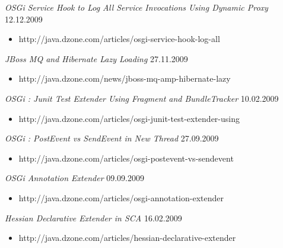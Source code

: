 \documentclass{res}
\begin{document}
\begin{resume}
{\sl OSGi Service Hook to Log All Service Invocations Using Dynamic Proxy}  \hfill    12.12.2009	\\
\vspace{-5mm}  \begin{itemize}
\item[]  \scriptsize http://java.dzone.com/articles/osgi-service-hook-log-all
\end{itemize}
\vspace{-2mm}

{\sl JBoss MQ and Hibernate Lazy Loading}  \hfill    27.11.2009	\\
\vspace{-5mm}  \begin{itemize}
\item[]  \scriptsize http://java.dzone.com/news/jboss-mq-amp-hibernate-lazy
\end{itemize}
\vspace{-2mm}

{\sl OSGi : Junit Test Extender Using Fragment and BundleTracker}  \hfill  10.02.2009	\\
\vspace{-5mm}  \begin{itemize}
\item[]  \scriptsize http://java.dzone.com/articles/osgi-junit-test-extender-using
\end{itemize}
\vspace{-2mm}

{\sl OSGi : PostEvent vs SendEvent in New Thread}  \hfill   27.09.2009	\\
\vspace{-5mm}  \begin{itemize}
\item[]  \scriptsize http://java.dzone.com/articles/osgi-postevent-vs-sendevent
\end{itemize}
\vspace{-2mm}

{\sl OSGi Annotation Extender}  \hfill    09.09.2009	\\
\vspace{-5mm}  \begin{itemize}
\item[]  \scriptsize http://java.dzone.com/articles/osgi-annotation-extender
\end{itemize}
\vspace{-2mm}

{\sl Hessian Declarative Extender in SCA}  \hfill   16.02.2009\\
\vspace{-5mm}  \begin{itemize}
\item[]  \scriptsize http://java.dzone.com/articles/hessian-declarative-extender
\end{itemize}
\vspace{-2mm}


\end{resume}
\end{document}
